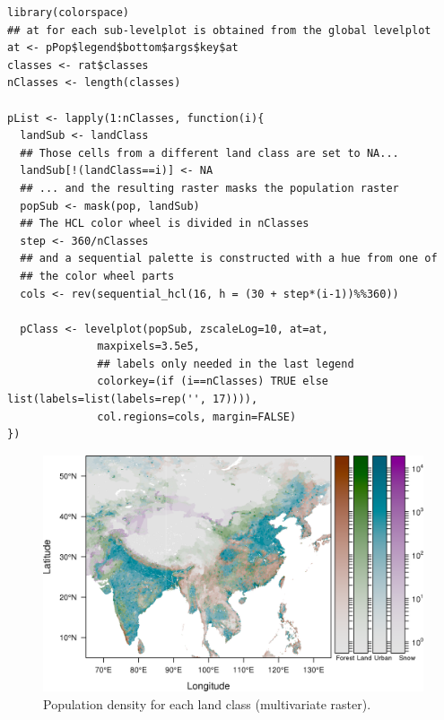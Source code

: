 \lstset{language=R,numbers=none}
\begin{lstlisting}
library(colorspace)
## at for each sub-levelplot is obtained from the global levelplot
at <- pPop$legend$bottom$args$key$at
classes <- rat$classes
nClasses <- length(classes)

pList <- lapply(1:nClasses, function(i){
  landSub <- landClass
  ## Those cells from a different land class are set to NA...
  landSub[!(landClass==i)] <- NA
  ## ... and the resulting raster masks the population raster
  popSub <- mask(pop, landSub)
  ## The HCL color wheel is divided in nClasses
  step <- 360/nClasses
  ## and a sequential palette is constructed with a hue from one of
  ## the color wheel parts
  cols <- rev(sequential_hcl(16, h = (30 + step*(i-1))%%360))

  pClass <- levelplot(popSub, zscaleLog=10, at=at,
		      maxpixels=3.5e5,
		      ## labels only needed in the last legend
		      colorkey=(if (i==nClasses) TRUE else list(labels=list(labels=rep('', 17)))),
		      col.regions=cols, margin=FALSE)
})
\end{lstlisting}


\begin{figure}[htb]
\centering
\includegraphics[width=.9\linewidth]{figs/popLandClass.png}
\caption{\label{fig:popLandClass}Population density for each land class (multivariate raster).}
\end{figure}
